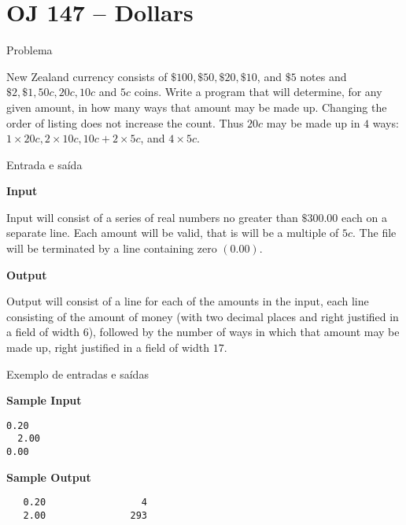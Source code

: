 \section{OJ 147 -- Dollars}

\begin{frame}[fragile]{Problema}

New Zealand currency consists of $\$100, \$50, \$20, \$10$, and $\$5$ notes and $\$2, \$1, 50c,
20c, 10c$ and $5c$ coins. Write a program that will determine, for any given amount, in how many
ways that amount may be made up. Changing the order of listing does not increase the count. Thus
$20c$ may be made up in $4$ ways: $1\times 20c, 2\times 10c, 10c+2\times 5c$, and $4\times 5c$.

\end{frame}

\begin{frame}[fragile]{Entrada e saída}

\textbf{Input}

Input will consist of a series of real numbers no greater than $\$300.00$ each on a separate line.
Each amount will be valid, that is will be a multiple of $5c$. The file will be terminated by a
line containing zero $(0.00)$.

\vspace{0.1in}

\textbf{Output}

Output will consist of a line for each of the amounts in the input, each line consisting of the
amount of money (with two decimal places and right justified in a field of width $6$), followed by
the number of ways in which that amount may be made up, right justified in a field of width $17$.

\end{frame}

\begin{frame}[fragile]{Exemplo de entradas e saídas}

\begin{minipage}[t]{0.45\textwidth}
\textbf{Sample Input}
\begin{verbatim}
0.20
  2.00
0.00
\end{verbatim}
\end{minipage}
\begin{minipage}[t]{0.5\textwidth}
\textbf{Sample Output}
\begin{verbatim}
   0.20                 4
   2.00               293
\end{verbatim}
\end{minipage}
\end{frame}

